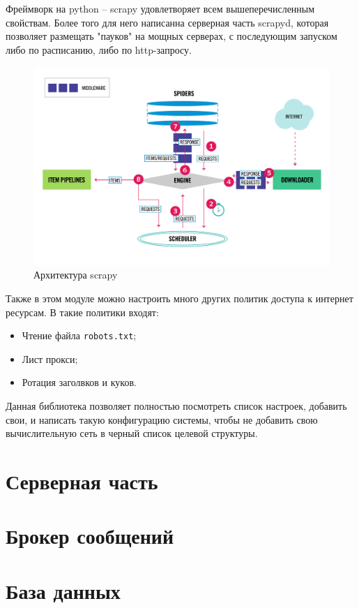 Фреймворк на python -- scrapy удовлетворяет всем вышеперечисленным свойствам.
Более того для него написанна серверная часть scrapyd, которая позволяет
размещать "пауков" на мощных серверах, с последующим запуском либо по
расписанию, либо по http-запросу.
\begin{figure}[H]
    \centering
    \includegraphics[scale=0.35]{inc/img/scrapy_architecture.png}
    \caption{Архитектура scrapy}
\end{figure}

Также в этом модуле можно настроить много других политик доступа к интернет ресурсам. В такие политики входят:
\begin{itemize}
    \item Чтение файла \verb|robots.txt|;
    \item Лист прокси;
    \item Ротация заголвков и куков.
\end{itemize}

Данная библиотека позволяет полностью посмотреть список настроек, добавить свои,
и написать такую конфигурацию системы, чтобы не добавить свою вычислительную
сеть в черный список целевой структуры.

\section{Серверная часть}

\section{Брокер сообщений}
\section{База данных}

